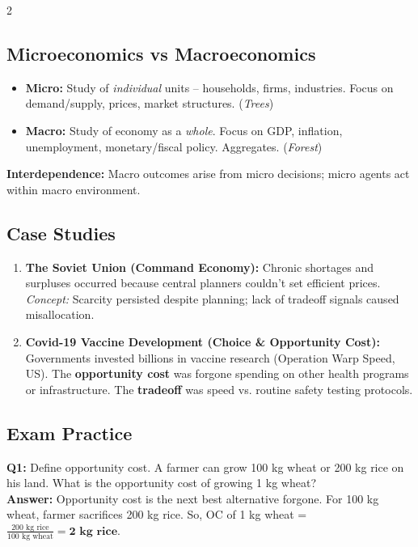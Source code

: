 \documentclass[10pt,a4paper]{article}
\begin{document}
\begin{multicols}{2}
\subsection*{Microeconomics vs Macroeconomics}
\begin{itemize}[leftmargin=*,nosep]
    \item \textbf{Micro:} Study of \textit{individual} units -- households, firms, industries. Focus on demand/supply, prices, market structures. (\textit{Trees})
    \item \textbf{Macro:} Study of economy as a \textit{whole}. Focus on GDP, inflation, unemployment, monetary/fiscal policy. Aggregates. (\textit{Forest})
\end{itemize}
\textbf{Interdependence:} Macro outcomes arise from micro decisions; micro agents act within macro environment.

\subsection*{Case Studies}
\begin{enumerate}[leftmargin=*,nosep]
    \item \textbf{The Soviet Union (Command Economy):} Chronic shortages and surpluses occurred because central planners couldn’t set efficient prices. \textit{Concept:} Scarcity persisted despite planning; lack of tradeoff signals caused misallocation.
    \item \textbf{Covid-19 Vaccine Development (Choice \& Opportunity Cost):} Governments invested billions in vaccine research (Operation Warp Speed, US). The \textbf{opportunity cost} was forgone spending on other health programs or infrastructure. The \textbf{tradeoff} was speed vs. routine safety testing protocols.
\end{enumerate}

\subsection*{Exam Practice}
\textbf{Q1:} Define opportunity cost. A farmer can grow 100 kg wheat or 200 kg rice on his land. What is the opportunity cost of growing 1 kg wheat?\\[0.1cm]
\textbf{Answer:} Opportunity cost is the next best alternative forgone. For 100 kg wheat, farmer sacrifices 200 kg rice. So, OC of 1 kg wheat = $\frac{200 \text{ kg rice}}{100 \text{ kg wheat}} = \mathbf{2 \text{ kg rice}}$.\\[0.2cm]


\end{multicols}
\end{document}
